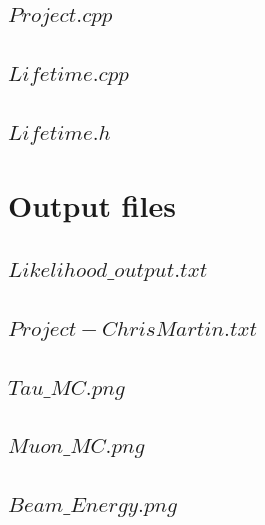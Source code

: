 \documentclass[aps,prl,groupedaddress]{revtex4}
\begin{document}
\subsection{$Project.cpp$}

\subsection{$Lifetime.cpp$}

\subsection{$Lifetime.h$}

\section{Output files}
\subsection{$Likelihood\_output.txt$}

\subsection{$Project-ChrisMartin.txt$}

\subsection{$Tau\_MC.png$}

\subsection{$Muon\_MC.png$}

\subsection{$Beam\_Energy.png$}
\end{document}
